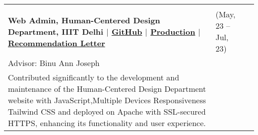 \documentclass[10pt]{extarticle}
\begin{document}
\begin{contained}
\begin{longtable}{p{}p{}p{}}
    \\\\
    \textbf{Web Admin, Human-Centered Design Department, IIIT Delhi  
     $\vert$ \href{https://github.com/kintsugi-programmer/HCD}{GitHub} $\vert$ \href{https://hcd.iiitd.ac.in/}{Production} $\vert$
    \href{https://drive.google.com/drive/folders/1c-4UNfR6s3NiEw_pWJEUwc6RTah0MxOR?usp=sharing}{Recommendation Letter} } &(May, 23 – Jul, 23)\\
    {Advisor: Binu Ann Joseph}\\
    Contributed significantly to the development and maintenance of the Human-Centered Design Department website with JavaScript,Multiple Devices Responsiveness Tailwind CSS and deployed on Apache with SSL-secured HTTPS, enhancing its functionality and user experience.\\
\end{longtable}%
\endgroup%
\end{contained}
\vspace{0pt}
\end{document}
